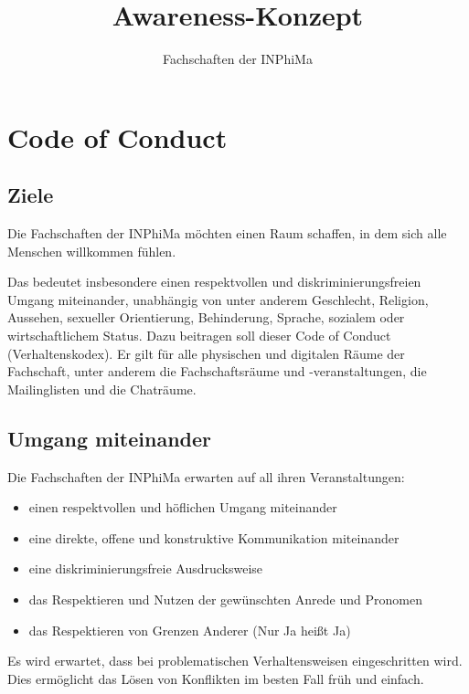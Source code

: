 \documentclass{article}
\title{Awareness-Konzept}
\author{Fachschaften der INPhiMa}
\begin{document}
\maketitle

\section{Code of Conduct}

\subsection{Ziele}
Die Fachschaften der INPhiMa möchten einen Raum schaffen, in dem sich alle Menschen willkommen fühlen.

Das bedeutet insbesondere einen respektvollen und diskriminierungsfreien Umgang miteinander, unabhängig von unter anderem Geschlecht, Religion, Aussehen, sexueller Orientierung, Behinderung, Sprache, sozialem oder wirtschaftlichem Status. Dazu beitragen soll dieser Code of Conduct (Verhaltenskodex). Er gilt für alle physischen und digitalen Räume der Fachschaft, unter anderem die Fachschaftsräume und -veranstaltungen, die Mailinglisten und die Chaträume.

\subsection{Umgang miteinander}
Die Fachschaften der INPhiMa erwarten auf all ihren Veranstaltungen:
\begin{itemize}
    \item einen respektvollen und höflichen Umgang miteinander
    \item eine direkte, offene und konstruktive Kommunikation miteinander
    \item eine diskriminierungsfreie Ausdrucksweise
    \item das Respektieren und Nutzen der gewünschten Anrede und Pronomen 
    \item das Respektieren von Grenzen Anderer (Nur Ja heißt Ja)
\end{itemize}
Es wird erwartet, dass bei problematischen Verhaltensweisen eingeschritten wird. Dies ermöglicht das Lösen von Konflikten im besten Fall früh und einfach.
\end{document}
